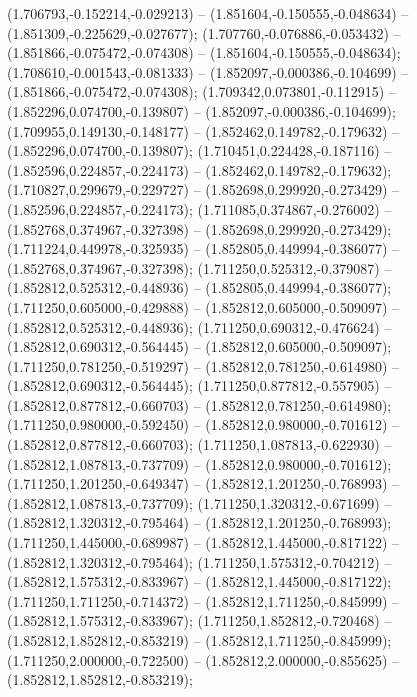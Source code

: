  (1.706793,-0.152214,-0.029213) -- (1.851604,-0.150555,-0.048634) -- (1.851309,-0.225629,-0.027677);
 (1.707760,-0.076886,-0.053432) -- (1.851866,-0.075472,-0.074308) -- (1.851604,-0.150555,-0.048634);
 (1.708610,-0.001543,-0.081333) -- (1.852097,-0.000386,-0.104699) -- (1.851866,-0.075472,-0.074308);
 (1.709342,0.073801,-0.112915) -- (1.852296,0.074700,-0.139807) -- (1.852097,-0.000386,-0.104699);
 (1.709955,0.149130,-0.148177) -- (1.852462,0.149782,-0.179632) -- (1.852296,0.074700,-0.139807);
 (1.710451,0.224428,-0.187116) -- (1.852596,0.224857,-0.224173) -- (1.852462,0.149782,-0.179632);
 (1.710827,0.299679,-0.229727) -- (1.852698,0.299920,-0.273429) -- (1.852596,0.224857,-0.224173);
 (1.711085,0.374867,-0.276002) -- (1.852768,0.374967,-0.327398) -- (1.852698,0.299920,-0.273429);
 (1.711224,0.449978,-0.325935) -- (1.852805,0.449994,-0.386077) -- (1.852768,0.374967,-0.327398);
 (1.711250,0.525312,-0.379087) -- (1.852812,0.525312,-0.448936) -- (1.852805,0.449994,-0.386077);
 (1.711250,0.605000,-0.429888) -- (1.852812,0.605000,-0.509097) -- (1.852812,0.525312,-0.448936);
 (1.711250,0.690312,-0.476624) -- (1.852812,0.690312,-0.564445) -- (1.852812,0.605000,-0.509097);
 (1.711250,0.781250,-0.519297) -- (1.852812,0.781250,-0.614980) -- (1.852812,0.690312,-0.564445);
 (1.711250,0.877812,-0.557905) -- (1.852812,0.877812,-0.660703) -- (1.852812,0.781250,-0.614980);
 (1.711250,0.980000,-0.592450) -- (1.852812,0.980000,-0.701612) -- (1.852812,0.877812,-0.660703);
 (1.711250,1.087813,-0.622930) -- (1.852812,1.087813,-0.737709) -- (1.852812,0.980000,-0.701612);
 (1.711250,1.201250,-0.649347) -- (1.852812,1.201250,-0.768993) -- (1.852812,1.087813,-0.737709);
 (1.711250,1.320312,-0.671699) -- (1.852812,1.320312,-0.795464) -- (1.852812,1.201250,-0.768993);
 (1.711250,1.445000,-0.689987) -- (1.852812,1.445000,-0.817122) -- (1.852812,1.320312,-0.795464);
 (1.711250,1.575312,-0.704212) -- (1.852812,1.575312,-0.833967) -- (1.852812,1.445000,-0.817122);
 (1.711250,1.711250,-0.714372) -- (1.852812,1.711250,-0.845999) -- (1.852812,1.575312,-0.833967);
 (1.711250,1.852812,-0.720468) -- (1.852812,1.852812,-0.853219) -- (1.852812,1.711250,-0.845999);
 (1.711250,2.000000,-0.722500) -- (1.852812,2.000000,-0.855625) -- (1.852812,1.852812,-0.853219);

